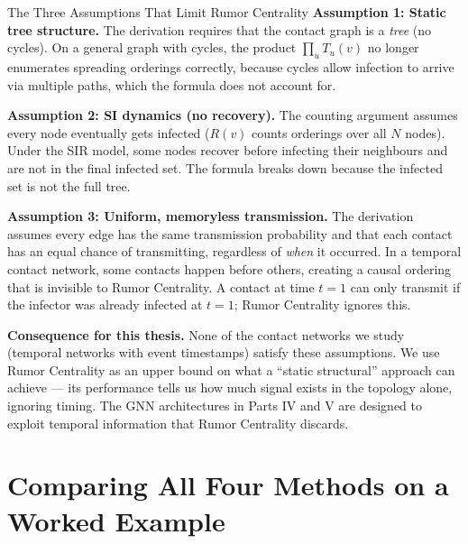 \begin{keyinsight}{The Three Assumptions That Limit Rumor Centrality}
\textbf{Assumption 1: Static tree structure.}
The derivation requires that the contact graph is a \emph{tree} (no cycles). On a
general graph with cycles, the product $\prod_u T_u(v)$ no longer enumerates spreading
orderings correctly, because cycles allow infection to arrive via multiple paths, which
the formula does not account for.

\textbf{Assumption 2: SI dynamics (no recovery).}
The counting argument assumes every node eventually gets infected ($R(v)$ counts
orderings over all $N$ nodes). Under the SIR model, some nodes recover before
infecting their neighbours and are not in the final infected set. The formula breaks
down because the infected set is not the full tree.

\textbf{Assumption 3: Uniform, memoryless transmission.}
The derivation assumes every edge has the same transmission probability and that each
contact has an equal chance of transmitting, regardless of \emph{when} it occurred.
In a temporal contact network, some contacts happen before others, creating a causal
ordering that is invisible to Rumor Centrality. A contact at time $t=1$ can only
transmit if the infector was already infected at $t=1$; Rumor Centrality ignores this.

\medskip
\textbf{Consequence for this thesis.} None of the contact networks we study (temporal
networks with event timestamps) satisfy these assumptions. We use Rumor Centrality as
an upper bound on what a ``static structural'' approach can achieve --- its performance
tells us how much signal exists in the topology alone, ignoring timing. The GNN
architectures in Parts IV and V are designed to exploit temporal information that
Rumor Centrality discards.
\end{keyinsight}

\section{Comparing All Four Methods on a Worked Example}
\label{sec:classical-comparison}

